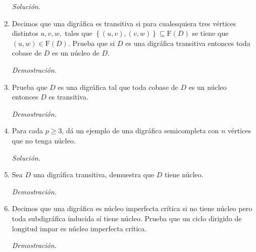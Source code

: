 \documentclass[12pt, fleqn]{article}
\newcommand{\F}[1]{\mathrm{F} \! \left( #1 \right)}
\begin{document}
\begin{enumerate}
		\emph{Solución.}

		
		
		\item Decimos que una digráfica es transitiva si para cualesquiera tres vértices distintos $ u, v, w, $ tales que $ \left\lbrace (u, v), (v,w) \right\rbrace \subseteq \F{D} $ se tiene que $ (u,w) \in \F{D} $. Prueba que si $D$ es una digráfica transitiva entonces toda cobase de $D$ es un núcleo de $D$.
		
		\emph{Demostración.}

		
		
		\item Prueba que $D$ es una digráfica tal que toda cobase de $D$ es un núcleo entonces $D$ es transitiva.
		
		\emph{Demostración.}

		
		
		\item Para cada $ p \geq 3 $, dá un ejemplo de una digráfica semicompleta con $n$ vértices que no tenga núcleo.
		
		\emph{Solución.}

		
		
		\item Sea $D$ una digráfica transitiva, demuestra que $D$ tiene núcleo.
		
		\emph{Demostración.}

		
		
		\item Decimos que una digráfica es núcleo imperfecta crítica si no tiene núcleo pero toda subdigráfica inducida sí tiene núcleo. Prueba que un ciclo dirigido de longitud impar es núcleo imperfecta crítica.
		
		\emph{Demostración.}

		
		
	\end{enumerate}
\end{document}
